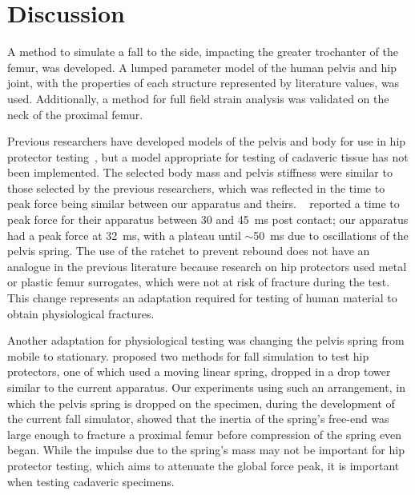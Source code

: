 \section{Discussion}
\label{sec:fall_sim_design_discussion}
A method to simulate a fall to the side, impacting the greater trochanter of the femur, was developed.
A lumped parameter model of the human pelvis and hip joint, with the properties of each structure represented by literature values, was used.
Additionally, a method for full field strain analysis was validated on the neck of the proximal femur.

Previous researchers have developed models of the pelvis and body for use in hip protector testing~\citep{robinovitch_prediction_1991, robinovitch_hip_2009, laing_force_2008}, but a model appropriate for testing of cadaveric tissue has not been implemented.
The selected body mass and pelvis stiffness were similar to those selected by the previous researchers, which was reflected in the time to peak force being similar between our apparatus and theirs.
\citeauthor{robinovitch_force_1995}~\citep{robinovitch_force_1995, robinovitch_hip_2009} reported a time to peak force for their apparatus between 30 and 45~\ac{ms} post contact; our apparatus had a peak force at 32~\ac{ms}, with a plateau until $\sim$50~\ac{ms} due to oscillations of the pelvis spring.
The use of the ratchet to prevent rebound does not have an analogue in the previous literature because research on hip protectors used metal or plastic femur surrogates, which were not at risk of fracture during the test.
This change represents an adaptation required for testing of human material to obtain physiological fractures.

Another adaptation for physiological testing was changing the pelvis spring from mobile to stationary.
\citet{robinovitch_hip_2009} proposed two methods for fall simulation to test hip protectors, one of which used a moving linear spring, dropped in a drop tower similar to the current apparatus.
Our experiments using such an arrangement, in which the pelvis spring is dropped on the specimen, during the development of the current fall simulator, showed that the inertia of the spring's free-end was large enough to fracture a proximal femur before compression of the spring even began.
While the impulse due to the spring's mass may not be important for hip protector testing, which aims to attenuate the global force peak, it is important when testing cadaveric specimens.

